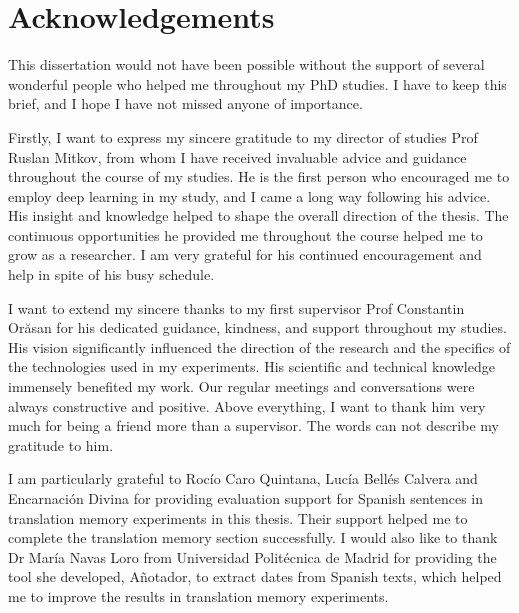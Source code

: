 
\chapter*{Acknowledgements}
This dissertation would not have been possible without the support of several wonderful people who helped me throughout my PhD studies. I have to keep this brief, and I hope I have not missed anyone of importance.

Firstly, I want to express my sincere gratitude to my director of studies Prof Ruslan Mitkov, from whom I have received invaluable advice and guidance throughout the course of my studies. He is the first person who encouraged me to employ deep learning in my study, and I came a long way following his advice. His insight and knowledge helped to shape the overall direction of the thesis. The continuous opportunities he provided me throughout the course helped me to grow as a researcher. I am very grateful for his continued encouragement and help in spite of his busy schedule.

I want to extend my sincere thanks to my first supervisor Prof Constantin Orăsan for his dedicated guidance, kindness, and support throughout my studies. His vision significantly influenced the direction of the research and the specifics of the technologies used in my experiments. His scientific and technical knowledge immensely benefited my work. Our regular meetings and conversations were always constructive and positive. Above everything, I want to thank him very much for being a friend more than a supervisor. The words can not describe my gratitude to him.

I am particularly grateful to Rocío Caro Quintana, Lucía Bellés Calvera and Encarnación Divina for providing evaluation support for Spanish sentences in translation memory experiments in this thesis. Their support helped me to complete the translation memory section successfully. I would also like to thank Dr María Navas Loro from Universidad Politécnica de Madrid for providing the tool she developed, Añotador, to extract dates from Spanish texts, which helped me to improve the results in translation memory experiments.


